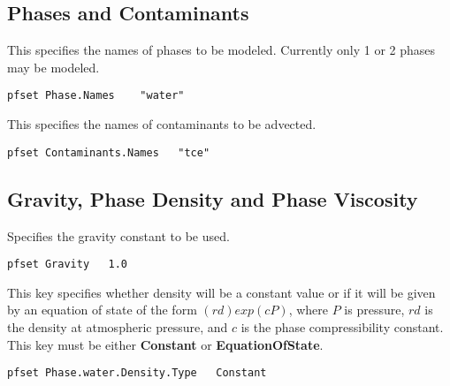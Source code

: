 
\subsection{Phases and Contaminants}
\label{Phases and Contaminants}

{This specifies the names of phases to be modeled. 
Currently only 1 or 2 phases may be modeled.}
\begin{display}\begin{verbatim}
pfset Phase.Names    "water"
\end{verbatim}\end{display}

{This specifies the names of contaminants to be advected.}
\begin{display}\begin{verbatim}
pfset Contaminants.Names   "tce"
\end{verbatim}\end{display}


\subsection{Gravity, Phase Density and Phase Viscosity}
\label{Gravity, Phase Density and Phase Viscosity}

{Specifies the gravity constant to be used.}
\begin{display}\begin{verbatim}
pfset Gravity	1.0
\end{verbatim}\end{display}

{This key specifies whether density will be a constant value or if 
it will be given by an equation of state of the form $(rd)exp(cP)$, 
where $P$ is pressure, $rd$ is
the density at atmospheric pressure, and $c$ is the phase
compressibility constant.
This key must be either {\bf Constant} or {\bf EquationOfState}.
}
\begin{display}\begin{verbatim}
pfset Phase.water.Density.Type	 Constant
\end{verbatim}\end{display}

